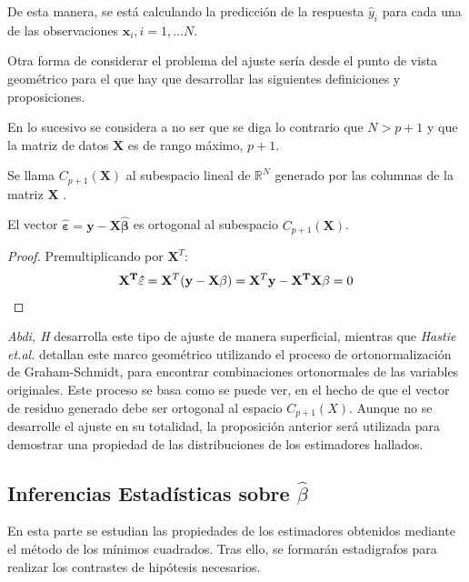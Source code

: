 \noindent De esta manera, se está calculando la predicción de la respuesta $\hat{y}_i$ para cada una de las observaciones $\mathbf{x}_i, i =1, \ldots N$. 

\noindent Otra forma de considerar el problema del ajuste sería desde el punto de vista geométrico para el que hay que desarrollar las siguientes definiciones y proposiciones.

\noindent En lo sucesivo se considera a no ser que se diga lo contrario que $N>p+1$ y que la matriz de datos $\mathbf{X}$ es de rango máximo, $p+1$. 

\begin{defi}
Se llama  $C_{p+1}(\mathbf{X})$ al subespacio lineal de $\mathbb{R}^{N}$ generado por las columnas de la matriz $\mathbf{X}$ \cite{Cuadras 2014}.
\end{defi}
\begin{propo}\label{prop ort}
El vector $\hat{\mathbf{\varepsilon}}=\mathbf{y}-\mathbf{X\hat{\beta}}$ es ortogonal al subespacio $C_{p+1}(\mathbf{X})$.
\begin{proof}
Premultiplicando por $\mathbf{X}^T$:
\begin{equation}
\begin{split}
\mathbf{X^T\hat{\mathbf{\varepsilon}}}=\mathbf{X}^T(\mathbf{y-X}\beta)=\mathbf{X}^T\mathbf{y}-\mathbf{X^T X}\beta=0 \qedhere
\end{split}
\end{equation}
\end{proof}
\end{propo}

\noindent \emph{Abdi, H} \cite{Abdi 2007} desarrolla este tipo de ajuste de manera superficial, mientras que  \emph{Hastie et.al.} \cite{Hastie 2001} detallan este marco geométrico utilizando el proceso de ortonormalización de Graham-Schmidt, para encontrar combinaciones ortonormales de las variables originales. Este proceso se basa como se puede ver, en el hecho de que el vector de residuo generado debe ser ortogonal al espacio $C_{p+1}(X)$. Aunque no se desarrolle el ajuste en su totalidad, la proposición anterior será utilizada para demostrar una propiedad de las distribuciones de los estimadores hallados. 

\subsection{Inferencias Estadísticas sobre $\hat{\beta}$}

\noindent En esta parte se estudian las propiedades de los estimadores obtenidos mediante el método de los mínimos cuadrados. Tras ello, se formarán estadigrafos para realizar los contrastes de hipótesis necesarios.


